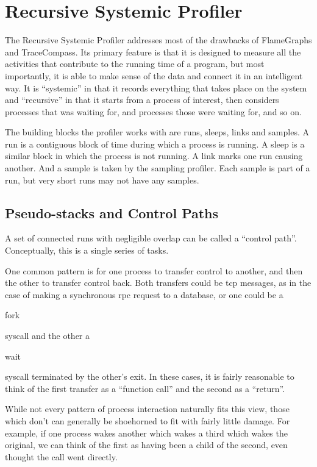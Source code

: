 \documentclass[10pt]{article}
\begin{document}
\section{Recursive Systemic Profiler}

The Recursive Systemic Profiler addresses most of the drawbacks of FlameGraphs
and TraceCompass. Its primary feature is that it is designed to measure all the
activities that contribute to the running time of a program, but most
importantly, it is able to make sense of the data and connect it in an
intelligent way. It is ``systemic'' in that it records everything that takes
place on the system and ``recursive'' in that it starts from a process of
interest, then considers processes that was waiting for, and processes those
were waiting for, and so on.

The building blocks the profiler works with are runs, sleeps, links and
samples.  A run is a contiguous block of time during which a process is
running.  A sleep is a similar block in which the process is not running.  A
link marks one run causing another.  And a sample is taken by the sampling
profiler.  Each sample is part of a run, but very short runs may not have any
samples.

\subsection{Pseudo-stacks and Control Paths}

A set of connected runs with negligible overlap can be called a ``control path''.  Conceptually, this is a single series of tasks.

One common pattern is for one process to transfer control to another, and then the other to transfer control back.  Both transfers could be tcp messages, as in the case of making a synchronous rpc request to a database, or one could be a \begin{tt}fork\end{tt} syscall and the other a \begin{tt}wait\end{tt} syscall terminated by the other's exit.  In these cases, it is fairly reasonable to think of the first transfer as a ``function call'' and the second as a ``return''.

While not every pattern of process interaction naturally fits this view, those which don't can generally be shoehorned to fit with fairly little damage.  For example, if one process wakes another which wakes a third which wakes the original, we can think of the first as having been a child of the second, even thought the call went directly.
\end{document}
